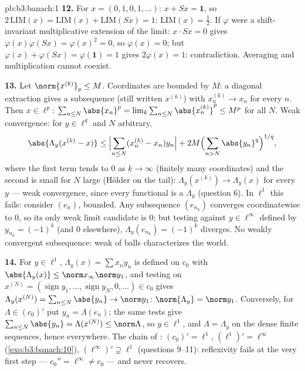 \begin{solution}{pb:b3:banach:1}
\textbf{12.} For $x = (0,1,0,1,\dots)$: $x + Sx = \mathbf 1$,
so $2\,\mathrm{LIM}(x) = \mathrm{LIM}(x) + \mathrm{LIM}(Sx) =
1$: $\mathrm{LIM}(x) = \frac12$. If $\varphi$ were a
shift-invariant multiplicative extension of the limit: $x\cdot
Sx = 0$ gives $\varphi(x)\varphi(Sx) = \varphi(x)^2 = 0$, so
$\varphi(x) = 0$; but $\varphi(x) + \varphi(Sx) =
\varphi(\mathbf 1) = 1$ gives $2\varphi(x) = 1$: contradiction.
Averaging and multiplication cannot coexist.

\textbf{13.} Let $\norm{x^{(k)}}_p \leq M$. Coordinates are
bounded by $M$: a diagonal extraction gives a subsequence
(still written $x^{(k)}$) with $x^{(k)}_n \to x_n$ for every
$n$. Then $x \in \ell^p$: $\sum_{n\leq N}\abs{x_n}^p =
\lim_k\sum_{n\leq N}\abs{x^{(k)}_n}^p \leq M^p$ for all $N$.
Weak convergence: for $y \in \ell^q$ and $N$ arbitrary,
\[
\abs{\Lambda_y(x^{(k)} - x)} \leq
\Bigl|\sum_{n \leq N}(x^{(k)}_n - x_n)y_n\Bigr|
+ 2M\Bigl(\sum_{n>N}\abs{y_n}^q\Bigr)^{1/q},
\]
where the first term tends to $0$ as $k \to \infty$ (finitely
many coordinates) and the second is small for $N$ large
(H\"older on the tail): $\Lambda_y(x^{(k)}) \to \Lambda_y(x)$
for every $y$ --- weak convergence, since every functional is a
$\Lambda_y$ (question 6). In $\ell^1$ this fails: consider
$(e_n)$, bounded. Any subsequence $(e_{n_k})$ converges
coordinatewise to $0$, so its only weak limit candidate is $0$;
but testing against $y \in \ell^\infty$ defined by $y_{n_k} =
(-1)^k$ (and $0$ elsewhere), $\Lambda_y(e_{n_k}) = (-1)^k$
diverges. No weakly convergent subsequence: weak  of balls characterizes the  world.

\textbf{14.} For $y \in \ell^1$, $\Lambda_y(x) = \sum x_ny_n$
is defined on $c_0$ with $\abs{\Lambda_y(x)} \leq \norm
x_\infty\norm y_1$, and testing on $x^{(N)} =
(\operatorname{sign}y_1, \dots, \operatorname{sign}y_N, 0,
\dots) \in c_0$ gives $\Lambda_y(x^{(N)}) =
\sum_{n\leq N}\abs{y_n} \to \norm y_1$:
$\norm{\Lambda_y} = \norm y_1$. Conversely, for $\Lambda \in
(c_0)'$ put $y_n = \Lambda(e_n)$; the same tests give
$\sum_{n \leq N}\abs{y_n} = \Lambda(x^{(N)}) \leq
\norm\Lambda$, so $y \in \ell^1$, and $\Lambda = \Lambda_y$ on
the dense finite sequences, hence everywhere. The chain of
: $(c_0)' = \ell^1$, $(\ell^1)' = \ell^\infty$
(\cref{exo:b3:banach:10}), $(\ell^\infty)' \supsetneq \ell^1$
(questions 9--11): reflexivity fails at the very first step
--- $c_0'' = \ell^\infty \neq c_0$ --- and never recovers.


\end{solution}
